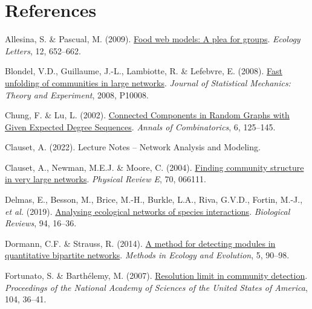 \documentclass[
]{article}
\newlength{\cslhangindent}
\newlength{\cslentryspacingunit} %
\newenvironment{CSLReferences}[2] %
 {%
  \setlength{\parindent}{0pt}
  \ifodd #1
  \let\oldpar\par
  \def\par{\hangindent=\cslhangindent\oldpar}
  \fi
  \setlength{\parskip}{#2\cslentryspacingunit}
 }%
 {}
\begin{document}
\hypertarget{references}{%
\section*{References}\label{references}}

\hypertarget{refs}{}
\begin{CSLReferences}{1}{0}
\leavevmode{}%
Allesina, S. \& Pascual, M. (2009).
\href{https://doi.org/10.1111/j.1461-0248.2009.01321.x}{Food web models:
A plea for groups}. \emph{Ecology Letters}, 12, 652--662.

\leavevmode{}%
Blondel, V.D., Guillaume, J.-L., Lambiotte, R. \& Lefebvre, E. (2008).
\href{https://doi.org/10.1088/1742-5468/2008/10/P10008}{Fast unfolding
of communities in large networks}. \emph{Journal of Statistical
Mechanics: Theory and Experiment}, 2008, P10008.

\leavevmode{}%
Chung, F. \& Lu, L. (2002).
\href{https://doi.org/10.1007/PL00012580}{Connected {Components} in
{Random Graphs} with {Given Expected Degree Sequences}}. \emph{Annals of
Combinatorics}, 6, 125--145.

\leavevmode{}%
Clauset, A. (2022). Lecture {Notes} -- {Network Analysis} and
{Modeling}.

\leavevmode{}%
Clauset, A., Newman, M.E.J. \& Moore, C. (2004).
\href{https://doi.org/10.1103/PhysRevE.70.066111}{Finding community
structure in very large networks}. \emph{Physical Review E}, 70, 066111.

\leavevmode{}%
Delmas, E., Besson, M., Brice, M.-H., Burkle, L.A., Riva, G.V.D.,
Fortin, M.-J., \emph{et al.} (2019).
\href{https://doi.org/10.1111/brv.12433}{Analysing ecological networks
of species interactions}. \emph{Biological Reviews}, 94, 16--36.

\leavevmode{}%
Dormann, C.F. \& Strauss, R. (2014).
\href{https://doi.org/10.1111/2041-210X.12139}{A method for detecting
modules in quantitative bipartite networks}. \emph{Methods in Ecology
and Evolution}, 5, 90--98.

\leavevmode{}%
Fortunato, S. \& Barthélemy, M. (2007).
\href{https://doi.org/10.1073/pnas.0605965104}{Resolution limit in
community detection}. \emph{Proceedings of the National Academy of
Sciences of the United States of America}, 104, 36--41.


\end{CSLReferences}
\end{document}
